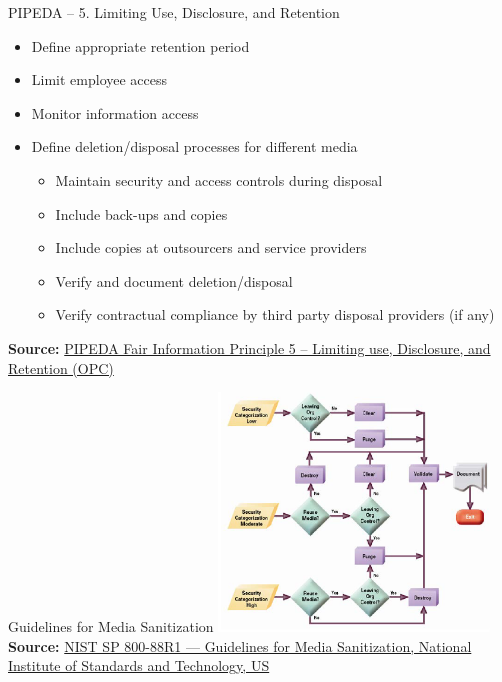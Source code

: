 \documentclass[ignorenonframetext,xcolor=x11names]{beamer}
\begin{document}
\begin{frame}{PIPEDA -- 5. Limiting Use, Disclosure, and Retention}
\begin{itemize}
   \item Define appropriate retention period
   \item Limit employee access
   \item Monitor information access
   \item Define deletion/disposal processes for different media
   \begin{itemize}
      \item Maintain security and access controls during disposal
      \item Include back-ups and copies
      \item Include copies at outsourcers and service providers
      \item Verify and document deletion/disposal
      \item Verify contractual compliance by third party disposal providers (if any)
   \end{itemize}
\end{itemize}

\vspace{\baselineskip}
\scriptsize \textbf{Source:} \href{https://www.priv.gc.ca/en/privacy-topics/privacy-laws-in-canada/the-personal-information-protection-and-electronic-documents-act-pipeda/p_principle/principles/p_use/}{PIPEDA Fair Information Principle 5 -- Limiting use, Disclosure, and Retention (OPC)}    

\end{frame}

\begin{frame}{Guidelines for Media Sanitization}
\centering
\includegraphics[height=2.5in]{screen1.png} \\

\vspace{\baselineskip}
\scriptsize \textbf{Source:} \href{https://nvlpubs.nist.gov/nistpubs/SpecialPublications/NIST.SP.800-88r1.pdf}{NIST SP 800-88R1 --- Guidelines for Media Sanitization, National Institute of Standards and Technology, US}
\end{frame}
\end{document}
